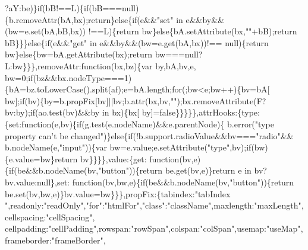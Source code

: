 \begin{DoxyCode}
      ?aY:be)\}\textcolor{keywordflow}{if}(bB!==L)\{\textcolor{keywordflow}{if}(bB===null)\{b.removeAttr(bA,bx);\textcolor{keywordflow}{return}\}\textcolor{keywordflow}{else}\{\textcolor{keywordflow}{if}(e&&\textcolor{stringliteral}{"set"} in e&&by&&(bw=e.set(bA,bB,bx))
      !==L)\{\textcolor{keywordflow}{return} bw\}\textcolor{keywordflow}{else}\{bA.setAttribute(bx,\textcolor{stringliteral}{""}+bB);\textcolor{keywordflow}{return} bB\}\}\}\textcolor{keywordflow}{else}\{\textcolor{keywordflow}{if}(e&&\textcolor{stringliteral}{"get"} in e&&by&&(bw=e.get(bA,bx))!==
      null)\{\textcolor{keywordflow}{return} bw\}\textcolor{keywordflow}{else}\{bw=bA.getAttribute(bx);\textcolor{keywordflow}{return} bw===null?L:bw\}\}\},removeAttr:\textcolor{keyword}{function}(bx,bz)\{var by,bA,bv,e,
      bw=0;\textcolor{keywordflow}{if}(bz&&bx.nodeType===1)\{bA=bz.toLowerCase().split(af);e=bA.length;\textcolor{keywordflow}{for}(;bw<e;bw++)\{bv=bA[
      bw];\textcolor{keywordflow}{if}(bv)\{by=b.propFix[bv]||bv;b.attr(bx,bv,\textcolor{stringliteral}{""});bx.removeAttribute(F?bv:by);\textcolor{keywordflow}{if}(ao.test(bv)&&by in bx)\{bx[
      by]=\textcolor{keyword}{false}\}\}\}\}\},attrHooks:\{type:\{\textcolor{keyword}{set}:\textcolor{keyword}{function}(e,bv)\{\textcolor{keywordflow}{if}(g.test(e.nodeName)&&e.parentNode)\{
      b.error(\textcolor{stringliteral}{"type property can't be changed"})\}\textcolor{keywordflow}{else}\{\textcolor{keywordflow}{if}(!b.support.radioValue&&bv===\textcolor{stringliteral}{"radio"}&&
      b.nodeName(e,\textcolor{stringliteral}{"input"}))\{var bw=e.value;e.setAttribute(\textcolor{stringliteral}{"type"},bv);\textcolor{keywordflow}{if}(bw)\{e.value=bw\}\textcolor{keywordflow}{return} bv\}\}\}\},value:\{\textcolor{keyword}{get}:\textcolor{keyword}{
      function}(bv,e)\{\textcolor{keywordflow}{if}(be&&b.nodeName(bv,\textcolor{stringliteral}{"button"}))\{\textcolor{keywordflow}{return} be.get(bv,e)\}\textcolor{keywordflow}{return} e in bv?bv.value:null\},\textcolor{keyword}{set}:\textcolor{keyword}{
      function}(bv,bw,e)\{\textcolor{keywordflow}{if}(be&&b.nodeName(bv,\textcolor{stringliteral}{"button"}))\{\textcolor{keywordflow}{return} be.set(bv,bw,e)\}bv.value=bw\}\}\},propFix:\{tabindex:\textcolor{stringliteral}{"tabIndex
      "},readonly:\textcolor{stringliteral}{"readOnly"},\textcolor{stringliteral}{"for"}:\textcolor{stringliteral}{"htmlFor"},\textcolor{stringliteral}{"class"}:\textcolor{stringliteral}{"className"},maxlength:\textcolor{stringliteral}{"maxLength"},cellspacing:\textcolor{stringliteral}{"cellSpacing"},
      cellpadding:\textcolor{stringliteral}{"cellPadding"},rowspan:\textcolor{stringliteral}{"rowSpan"},colspan:\textcolor{stringliteral}{"colSpan"},usemap:\textcolor{stringliteral}{"useMap"},frameborder:\textcolor{stringliteral}{"frameBorder"},

\end{DoxyCode}
